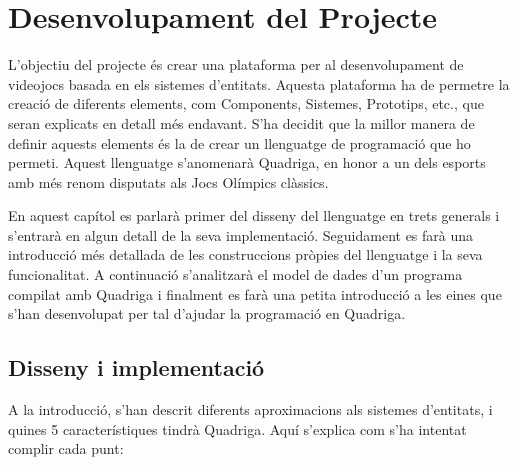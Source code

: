 \chapter{Desenvolupament del Projecte}
\label{chap:Desenvolupament}

L'objectiu del projecte és crear una plataforma per al desenvolupament de videojocs basada en els sistemes d'entitats. Aquesta plataforma ha de permetre la creació de diferents elements, com Components, Sistemes, Prototips, etc., que seran explicats en detall més endavant.
S'ha decidit que la millor manera de definir aquests elements és la de crear un llenguatge de programació que ho permeti. Aquest llenguatge s'anomenarà Quadriga, en honor a un dels esports amb més renom disputats als Jocs Olímpics clàssics.

En aquest capítol es parlarà primer del disseny del llenguatge en trets generals i s'entrarà en algun detall de la seva implementació. Seguidament es farà una introducció més detallada de les construccions pròpies del llenguatge i la seva funcionalitat. A continuació s'analitzarà el model de dades d'un programa compilat amb Quadriga i finalment es farà una petita introducció a les eines que s'han desenvolupat per tal d'ajudar la programació en Quadriga.

\section{Disseny i implementació}

  A la introducció, s'han descrit diferents aproximacions als sistemes d'entitats, i quines 5 característiques tindrà Quadriga. Aquí s'explica com s'ha intentat complir cada punt:

